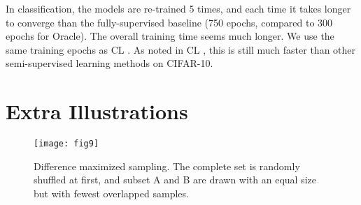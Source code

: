 \documentclass[preprint,review,10pt]{elsarticle}
\begin{document}
In classification, the models are re-trained 5 times, and each time it takes longer to converge than the fully-supervised baseline (750 epochs, compared to 300 epochs for Oracle). The overall training time seems much longer. We use the same training epochs as CL \cite{cascante2020curriculum}. As noted in CL \cite{cascante2020curriculum}, this is still much faster than other semi-supervised learning methods on CIFAR-10.

\section{Extra Illustrations}

\begin{figure}[h]
\centering
\texttt{[image: fig9]}
\caption{Difference maximized sampling. The complete set is randomly shuffled at first, and subset A and B are drawn with an equal size but with fewest overlapped samples.}
\label{fig:r2}
\end{figure}


 

\end{document}
